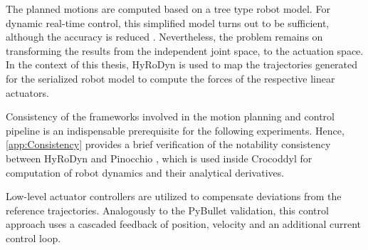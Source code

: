 The planned motions are computed based on a tree type robot model. For dynamic real-time control, this simplified model turns out to be sufficient, although the accuracy is reduced \cite{kumar2019model}. Nevertheless, the problem remains on transforming the results from the independent joint space, to the actuation space. In the context of this thesis, HyRoDyn is used to map the trajectories generated for the serialized robot model to compute the forces of the respective linear actuators.

Consistency of the frameworks involved in the motion planning and control pipeline is an indispensable prerequisite for the following experiments. Hence, \cref{app:Consistency} provides a brief verification of the notability consistency between HyRoDyn and Pinocchio \cite{carpentier2019pinocchio}, which is used inside Crocoddyl for computation of robot dynamics and their analytical derivatives. 

Low-level actuator controllers are utilized to compensate deviations from the reference trajectories. Analogously to the PyBullet validation, this control approach uses a cascaded feedback of position, velocity and an additional current control loop. 

